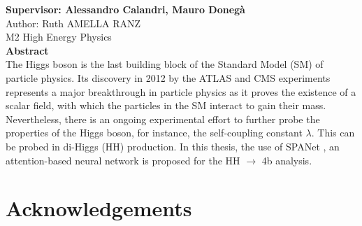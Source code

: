 \documentclass[11pt]{article}
\numberwithin{figure}{section}  %
\numberwithin{table}{section}   %
\numberwithin{equation}{section} %
\begin{document}
\begin{titlepage}
{\large\textbf{Supervisor: Alessandro Calandri, Mauro Donegà}}\\[1cm]
Author: Ruth AMELLA RANZ\\
M2 High Energy Physics
\\[1cm]
\textbf{Abstract}\\[1cm]
\justifying
The Higgs boson is the last building block of the Standard Model (SM) of particle physics. Its discovery in 2012 by the ATLAS \cite{ATLASdecouvhiggs} and CMS \cite{CMShiggsdecouv} experiments represents a major breakthrough in particle physics as it proves the existence of a scalar field, with which the particles in the SM interact to gain their mass. Nevertheless,  there is an ongoing experimental effort to further probe the properties of the Higgs boson, for instance, the self-coupling constant $\lambda$. This can be probed in di-Higgs (HH) production. In this thesis, the use of SPANet \cite{SPANet}, an attention-based neural network is proposed for the HH $\to$ 4b analysis. 

\end{titlepage}

\newpage
{}
\tableofcontents
{}
\pagestyle{fancy}
\fancyhf{}
\fancyhead[L]{\rightmark}
\fancyfoot[C]{\thepage}
\setlength{\headheight}{13.59999pt}
\addtolength{\topmargin}{-1.59999pt}
\setlength{\headheight}{25.22153pt}
\addtolength{\topmargin}{-11.62154pt}

\newpage















\section*{Acknowledgements}


% 
% 

\printbibliography
\end{document}
